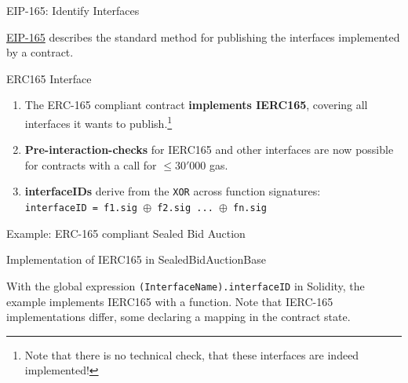 \documentclass[handout]{beamer}
\begin{document}
\begin{frame}{EIP-165: Identify Interfaces}

\link \href{https://eips.ethereum.org/EIPS/eip-165}{EIP-165} describes the standard method for publishing the interfaces implemented by a contract. 

\begin{samplecode}{ERC165 Interface}
		
\end{samplecode}

\begin{enumerate}
	\item	The ERC-165 compliant contract \textbf{implements IERC165}, covering all interfaces it wants to publish.\footnote{Note that there is no technical check, that these interfaces are indeed implemented!}
	\item	\textbf{Pre-interaction-checks} for IERC165 and other interfaces are now possible for contracts with a call for $\leq 30'000$ gas.
	\item	\textbf{interfaceIDs} derive from the \texttt{XOR} across function signatures:\\
			\color{darkmint} \texttt{interfaceID = f1.sig $\oplus$ f2.sig ... $\oplus$ fn.sig}
\end{enumerate}

\end{frame}

\begin{frame}{Example: ERC-165 compliant Sealed Bid Auction}

\begin{samplecode}{Implementation of IERC165 in SealedBidAuctionBase}
		
\end{samplecode}

\footnotesize{With the global expression \texttt{(InterfaceName).interfaceID} in Solidity, the example implements IERC165 with a  function. Note that IERC-165 implementations differ, some declaring a mapping in the contract state. }

\end{frame}
\end{document}
